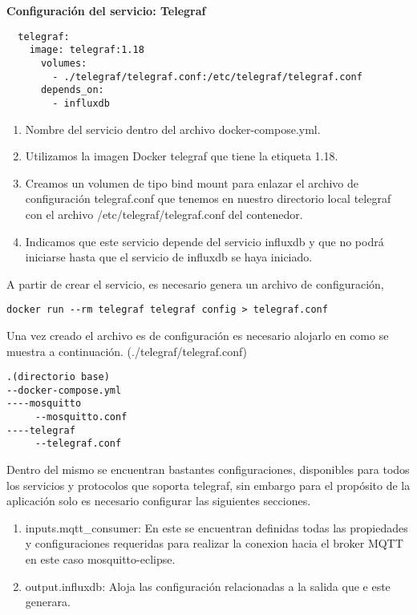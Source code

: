 \begin{flushleft}
  \textbf{Configuración del servicio: Telegraf}
\end{flushleft}
\begin{verbatim}
  telegraf: 
    image: telegraf:1.18 
      volumes:
        - ./telegraf/telegraf.conf:/etc/telegraf/telegraf.conf 
      depends_on: 
        - influxdb
\end{verbatim}
\begin{enumerate}
  \item Nombre del servicio dentro del archivo docker-compose.yml.
  \item Utilizamos la imagen Docker telegraf que tiene la etiqueta 1.18.
  \item Creamos un volumen de tipo bind mount para enlazar el archivo de
    configuración telegraf.conf que tenemos en nuestro directorio local
    telegraf con el archivo /etc/telegraf/telegraf.conf del contenedor.
  \item Indicamos que este servicio depende del servicio influxdb y que no
    podrá iniciarse hasta que el servicio de influxdb se haya iniciado.
\end{enumerate}

A partir de crear el servicio, es necesario genera un archivo de configuración, 
\begin{verbatim}
docker run --rm telegraf telegraf config > telegraf.conf
\end{verbatim}
Una vez creado el archivo es de configuración es necesario alojarlo en como se
muestra a continuación. (./telegraf/telegraf.conf)
\begin{verbatim}
.(directorio base)
--docker-compose.yml
----mosquitto
     --mosquitto.conf
----telegraf
     --telegraf.conf
\end{verbatim}
Dentro del mismo se encuentran bastantes configuraciones, disponibles para todos
los servicios y protocolos que soporta telegraf, sin embargo para el propósito
de la aplicación solo es necesario configurar las siguientes secciones.

\begin{enumerate}
  \item inputs.mqtt\_consumer: En este se encuentran definidas todas las
    propiedades y configuraciones requeridas para realizar la conexion hacia el
    broker MQTT en este caso mosquitto-eclipse. 
  \item output.influxdb: Aloja las configuración relacionadas a la salida que e
    este generara.
\end{enumerate}

